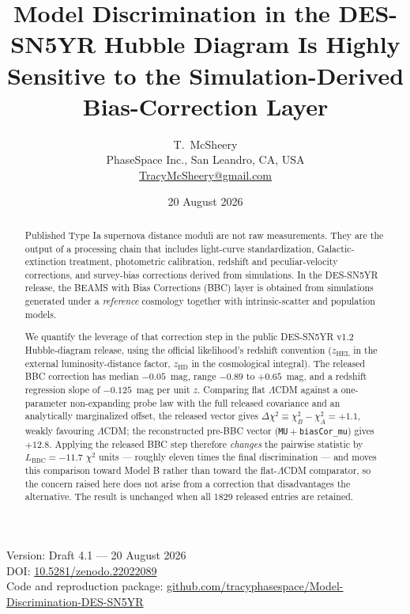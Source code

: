 \documentclass[11pt]{article}
\title{Model Discrimination in the DES-SN5YR Hubble Diagram Is Highly
Sensitive to the Simulation-Derived Bias-Correction Layer}
\author{T.~McSheery\\
\small PhaseSpace Inc., San Leandro, CA, USA\\
\small \href{mailto:TracyMcSheery@gmail.com}{TracyMcSheery@gmail.com}}
\date{20 August 2026}
\newcommand{\paperdoi}{10.5281/zenodo.22022089}
\begin{document}
\maketitle

\begin{center}
\small
Version: Draft 4.1 --- 20 August 2026\\
DOI: \href{https://doi.org/10.5281/zenodo.22022089}{\paperdoi}\\
Code and reproduction package:
\href{https://github.com/tracyphasespace/Model-Discrimination-DES-SN5YR}{github.com/tracyphasespace/Model-Discrimination-DES-SN5YR}
\end{center}

\begin{abstract}
Published Type Ia supernova distance moduli are not raw measurements. They
are the output of a processing chain that includes light-curve
standardization, Galactic-extinction treatment, photometric calibration,
redshift and peculiar-velocity corrections, and survey-bias corrections
derived from simulations. In the DES-SN5YR release, the BEAMS with Bias
Corrections (BBC) layer is obtained from simulations generated under a
\emph{reference} cosmology together with intrinsic-scatter and population
models.

We quantify the leverage of that correction step in the public DES-SN5YR
v1.2 Hubble-diagram release, using the official likelihood's redshift
convention ($z_{\mathrm{HEL}}$ in the external luminosity-distance factor,
$z_{\mathrm{HD}}$ in the cosmological integral). The released BBC
correction has median $-0.05$~mag, range $-0.89$ to $+0.65$~mag, and a
redshift regression slope of $-0.125$~mag per unit $z$. Comparing flat
$\Lambda$CDM against a one-parameter non-expanding probe law with the full
released covariance and an analytically marginalized offset, the released
vector gives $\Delta\chi^2 \equiv \chi^2_B - \chi^2_A = +1.1$, weakly
favouring $\Lambda$CDM; the reconstructed pre-BBC vector
(\texttt{MU}${}+{}$\texttt{biasCor\_mu}) gives $+12.8$. Applying the
released BBC step therefore \emph{changes} the pairwise statistic by
$L_{\mathrm{BBC}} = -11.7$ $\chi^2$ units --- roughly eleven times the
final discrimination --- and moves this comparison toward Model B rather than
toward the flat-$\Lambda$CDM comparator, so the concern raised here does
not arise from a correction that disadvantages the alternative. The result is
unchanged when all 1829 released entries are retained.


\end{abstract}
\end{document}
